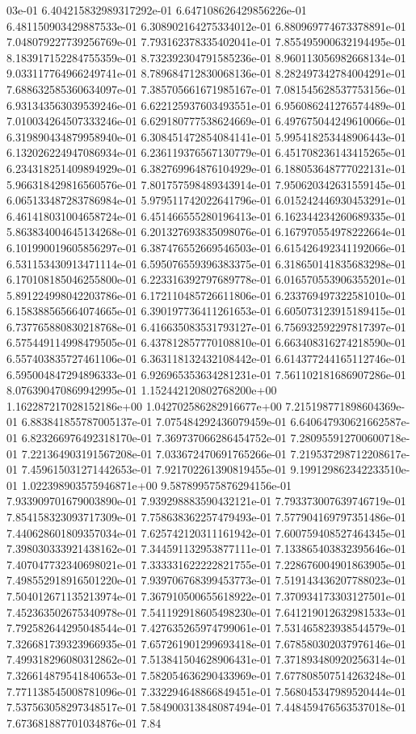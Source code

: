 03e-01	6.404215832989317292e-01	6.647108626429856226e-01	6.481150903429887533e-01	6.308902164275334012e-01	6.880969774673378891e-01	7.048079227739256769e-01	7.793162378335402041e-01	7.855495900632194495e-01	8.183917152284755359e-01	8.732392304791585236e-01	8.960113056982668134e-01	9.033117764966249741e-01	8.789684712830068136e-01	8.282497342784004291e-01	7.688632585360634097e-01	7.385705661671985167e-01	7.081545628537753156e-01	6.931343563039539246e-01	6.622125937603493551e-01	6.956086241276574489e-01	7.010034264507333246e-01	6.629180777538624669e-01	6.497675044249610066e-01	6.319890434879958940e-01	6.308451472854084141e-01	5.995418253448906443e-01	6.132026224947086934e-01	6.236119376567130779e-01	6.451708236143415265e-01	6.234318251409894929e-01	6.382769964876104929e-01	6.188053648777022131e-01	5.966318429816560576e-01	7.801757598489343914e-01	7.950620342631559145e-01	6.065133487283786984e-01	5.979511742022641796e-01	6.015242446930453291e-01	6.461418031004658724e-01	6.451466555280196413e-01	6.162344234260689335e-01	5.863834004645134268e-01	6.201327693835098076e-01	6.167970554978222664e-01	6.101990019605856297e-01	6.387476552669546503e-01	6.615426492341192066e-01	6.531153430913471114e-01	6.595076559396383375e-01	6.318650141835683298e-01	6.170108185046255800e-01	6.223316392797689778e-01	6.016570553906355201e-01	5.891224998042203786e-01	6.172110485726611806e-01	6.233769497322581010e-01	6.158388565664074665e-01	6.390197736411261653e-01	6.605073123915189415e-01	6.737765880830218768e-01	6.416635083531793127e-01	6.756932592297817397e-01	6.575449114998479505e-01	6.437812857770108810e-01	6.663408316274218590e-01	6.557403835727461106e-01	6.363118132432108442e-01	6.614377244165112746e-01	6.595004847294896333e-01	6.926965353634281231e-01	7.561102181686907286e-01	8.076390470869942995e-01	1.152442120802768200e+00	1.162287217028152186e+00	1.042702586282916677e+00	7.215198771898604369e-01	6.883841855787005137e-01	7.075484292436079459e-01	6.640647930621662587e-01	6.823266976492318170e-01	7.369737066286454752e-01	7.280955912700600718e-01	7.221364903191567208e-01	7.033672470691765266e-01	7.219537298712208617e-01	7.459615031271442653e-01	7.921702261390819455e-01	9.199129862342233510e-01	1.022398903575946871e+00	9.587899575876294156e-01	7.933909701679003890e-01	7.939298883590432121e-01	7.793373007639746719e-01	7.854158323093717309e-01	7.758638362257479493e-01	7.577904169797351486e-01	7.440628601809357034e-01	7.625742120311161942e-01	7.600759408527464345e-01	7.398030333921438162e-01	7.344591132953877111e-01	7.133865403832395646e-01	7.407047732340698021e-01	7.333331622222821755e-01	7.228676004901863905e-01	7.498552918916501220e-01	7.939706768399453773e-01	7.519143436207788023e-01	7.504012671135213974e-01	7.367910500655618922e-01	7.370934173303127501e-01	7.452363502675340978e-01	7.541192918605498230e-01	7.641219012632981533e-01	7.792582644295048544e-01	7.427635265974799061e-01	7.531465823938544579e-01	7.326681739323966935e-01	7.657261901299693418e-01	7.678580302037976146e-01	7.499318296080312862e-01	7.513841504628906431e-01	7.371893480920256314e-01	7.326614879541840653e-01	7.582054636290433969e-01	7.677808507514263248e-01	7.771138545008781096e-01	7.332294648866849451e-01	7.568045347989520444e-01	7.537563058297348517e-01	7.584900313848087494e-01	7.448459476563537018e-01	7.673681887701034876e-01	7.84